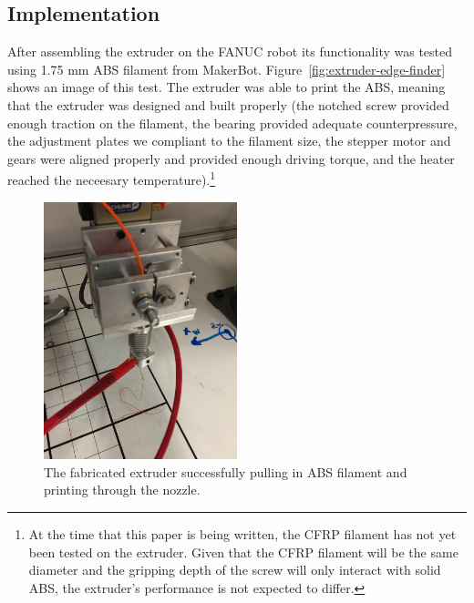 \clearpage

\subsection{Implementation}

\indent

After assembling the extruder on the FANUC robot its functionality was tested using 1.75 mm ABS filament from MakerBot. Figure~\ref{fig:extruder-edge-finder} shows an image of this test. The extruder was able to print the ABS, meaning that the extruder was designed and built properly (the notched screw provided enough traction on the filament, the bearing provided adequate counterpressure, the adjustment plates we compliant to the filament size, the stepper motor and gears were aligned properly and provided enough driving torque, and the heater reached the neceesary temperature).\footnote{At the time that this paper is being written, the CFRP filament has not yet been tested on the extruder. Given that the CFRP filament will be the same diameter and the gripping depth of the screw will only interact with solid ABS, the extruder's performance is not expected to differ.}\\

\begin{figure}[h!]
\centering
\includegraphics[width=0.5\textwidth]{./figures/extruder-abs-extrude}
\caption{The fabricated extruder successfully pulling in ABS filament and printing through the nozzle.}
\label{fig:extruder-abs-extrude}
\end{figure}

